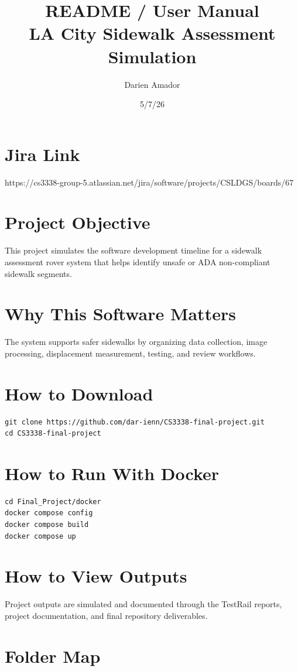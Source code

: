 \documentclass{article}
\title{README / User Manual\\LA City Sidewalk Assessment Simulation}
\author{Darien Amador}
\date{5/7/26}
\begin{document}
\maketitle

\section{Jira Link}
https://cs3338-group-5.atlassian.net/jira/software/projects/CSLDGS/boards/67

\section{Project Objective}
This project simulates the software development timeline for a sidewalk assessment rover system that helps identify unsafe or ADA non-compliant sidewalk segments.

\section{Why This Software Matters}
The system supports safer sidewalks by organizing data collection, image processing, displacement measurement, testing, and review workflows.

\section{How to Download}
\begin{verbatim}
git clone https://github.com/dar-ienn/CS3338-final-project.git
cd CS3338-final-project
\end{verbatim}

\section{How to Run With Docker}
\begin{verbatim}
cd Final_Project/docker
docker compose config
docker compose build
docker compose up
\end{verbatim}

\section{How to View Outputs}
Project outputs are simulated and documented through the TestRail reports, project documentation, and final repository deliverables.

\section{Folder Map}
\end{document}
